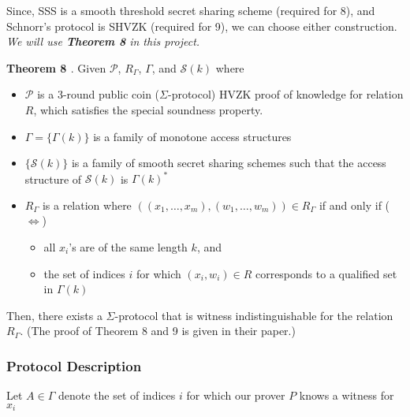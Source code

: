 Since, SSS is a smooth threshold secret sharing scheme (required for 8), and Schnorr's protocol is SHVZK (required for 9), we can choose either construction. 
\textit{We will use \textbf{Theorem 8} in this project.}

\textbf{Theorem 8 \cite{CDS94}}. Given $\mathcal P$, $R_\Gamma$, $\Gamma$, and $\mathcal S(k)$ where

\begin{itemize}
    \item $\mathcal P$ is a 3-round public coin ($\Sigma$-protocol) HVZK proof of knowledge for relation $R$, which satisfies the special soundness property.
    \item $\Gamma = \{ \Gamma(k) \}$ is a family of monotone access structures
    \item $\{\mathcal S(k)\}$ is a family of smooth secret sharing schemes such that the access structure of $\mathcal S(k)$ is $\Gamma(k)^*$
    \item $R_\Gamma$ is a relation where $((x_1,\ldots,x_m),(w_1,\ldots,w_m)) \in R_\Gamma$ if and only if ($\iff$)
    \begin{itemize}
        \item all $x_i$'s are of the same length $k$, and 
        \item the set of indices $i$ for which $(x_i,w_i) \in R$ corresponds to a qualified set in $\Gamma(k)$
    \end{itemize}
\end{itemize}

Then, there exists a $\Sigma$-protocol that is witness indistinguishable for the relation $R_\Gamma$. (The proof of Theorem 8 and 9 is given in their paper.)

\subsubsection{Protocol Description}
Let $A \in \Gamma$ denote the set of indices $i$ for which our prover $P$ knows a witness for $x_i$


